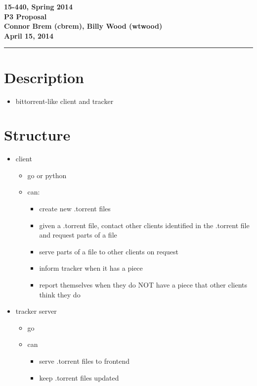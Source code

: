 \documentclass[11pt]{article}
\newcommand{\assignment}{P3 Proposal}
\newcommand{\duedate}{April 15, 2014}
\newcommand{\header}{\noindent \textbf{15-440, Spring 2014 \\ \assignment \\ Connor Brem (cbrem), Billy Wood (wtwood) \\ \duedate} \vspace{0.10in} \hrule}
\begin{document}
    \header

    \section*{Description}

        \begin{itemize}
            \item bittorrent-like client and tracker
        \end{itemize}

    \section*{Structure}

        \begin{itemize}
            \item client
                \begin{itemize}
                    \item go or python
                    \item can:
                        \begin{itemize}
                            \item create new .torrent files
                            \item given a .torrent file, contact other clients identified in the .torrent file and request parts of a file
                            \item serve parts of a file to other clients on request
                            \item inform tracker when it has a piece
                            \item report themselves when they do NOT have a piece that other clients think they do
                        \end{itemize}
                \end{itemize}
            \item tracker server
                \begin{itemize}
                    \item go
                    \item can
                        \begin{itemize}
                            \item serve .torrent files to frontend
                            \item keep .torrent files updated
                                \begin{itemize}

\end{itemize}
\end{itemize}
\end{itemize}
\end{itemize}
\end{document}
